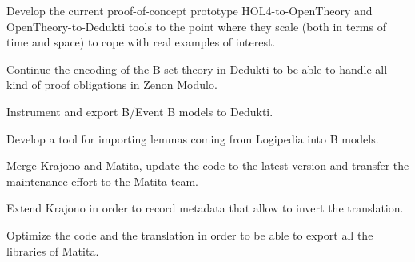 \begin{workpackage}
\begin{tasklist}
\begin{task}[id=HOL4,
  title=Instrument HOL4,
  lead=Cha,
  ChaRM=16.5,
  wphases=1-14]
%
\begin{compactitem}
\item Develop the current proof-of-concept prototype
    HOL4-to-OpenTheory and OpenTheory-to-Dedukti tools to the point
    where they scale (both in terms of time and space) to cope with
    real examples of interest.
\end{compactitem}
\end{task}

\begin{task}[id=atelier-b,
  title=Instrument Atelier-B/Rodin,
  lead=Imt,
  CleRM=14,
  ImtRM=1,
  TouRM=11]
%
\begin{compactitem}
\item Continue the encoding of the B set theory in Dedukti to be
  able to handle all kind of proof obligations in Zenon Modulo.
\item Instrument and export B/Event B models to Dedukti.
\item Develop a tool for importing lemmas coming from Logipedia
into B models.
\end{compactitem}
\end{task}

\begin{task}[id=matita,
  title=Integrate the Matita translator in Matita itself,
  lead=Bol,
  BolRM=4,
  wphases=1-12]
\begin{compactitem}
\item Merge Krajono and Matita, update the code to the latest
  version and transfer the maintenance effort to the Matita team.
\item Extend Krajono in order to record metadata that allow to
  invert the translation.
\item Optimize the code and the translation in order to be able to
  export all the libraries of Matita.
\end{compactitem}
\end{task}


\end{tasklist}
\end{workpackage}
